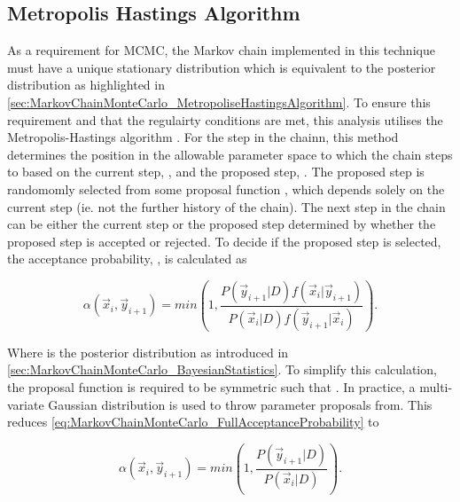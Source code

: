 \subsection{Metropolis Hastings Algorithm}
\label{sec:MarkovChainMonteCarlo_MetropoliseHastingsAlgorithm}

As a requirement for MCMC, the Markov chain implemented in this technique must have a unique stationary distribution which is equivalent to the posterior distribution as highlighted in \autoref{sec:MarkovChainMonteCarlo_MetropoliseHastingsAlgorithm}. To ensure this requirement and that the regulairty conditions are met, this analysis utilises the Metropolis-Hastings algorithm \cite{metropolis, hastings}. For the  step in the chainn, this method determines the position in the allowable parameter space to which the chain steps to based on the current step, , and the proposed step, . The proposed step is randomomly selected from some proposal function , which depends solely on the current step (ie. not the further history of the chain). The next step in the chain  can be either the current step or the proposed step determined by whether the proposed step is accepted or rejected. To decide if the proposed step is selected, the acceptance probability, , is calculated as

\begin{equation}
  \label{eq:MarkovChainMonteCarlo_FullAcceptanceProbability}
  \alpha(\vec{x}_{i},\vec{y}_{i+1}) = min\left(1,\frac{P(\vec{y}_{i+1}|D)f(\vec{x}_{i}|\vec{y}_{i+1})}{P(\vec{x}_{i}|D)f(\vec{y}_{i+1}|\vec{x}_{i})} \right).
\end{equation}

Where  is the posterior distribution as introduced in \autoref{sec:MarkovChainMonteCarlo_BayesianStatistics}. To simplify this calculation, the proposal function is required to be symmetric such that . In practice, a multi-variate Gaussian distribution is used to throw parameter proposals from. This reduces \autoref{eq:MarkovChainMonteCarlo_FullAcceptanceProbability} to

\begin{equation}
  \label{eq:MarkovChainMonteCarlo_ReducedAcceptanceProbability}
  \alpha(\vec{x}_{i},\vec{y}_{i+1}) = min\left(1,\frac{P(\vec{y}_{i+1}|D)}{P(\vec{x}_{i}|D)} \right).
\end{equation}

